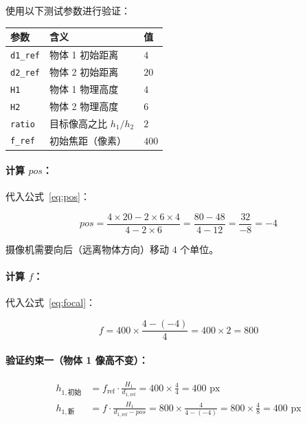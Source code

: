 \documentclass[12pt,a4paper]{ctexart}
\begin{document}
使用以下测试参数进行验证：

\begin{center}
\begin{tabular}{lll}
\toprule
参数 & 含义 & 值 \\
\midrule
\texttt{d1\_ref} & 物体 1 初始距离 & $4$ \\
\texttt{d2\_ref} & 物体 2 初始距离 & $20$ \\
\texttt{H1}      & 物体 1 物理高度 & $4$ \\
\texttt{H2}      & 物体 2 物理高度 & $6$ \\
\texttt{ratio}   & 目标像高之比 $h_1/h_2$ & $2$ \\
\texttt{f\_ref}  & 初始焦距（像素） & $400$ \\
\bottomrule
\end{tabular}
\end{center}

\paragraph{计算 $pos$：}代入公式~\eqref{eq:pos}：

\begin{equation}
  pos = \frac{4 \times 20 - 2 \times 6 \times 4}{4 - 2 \times 6} = \frac{80 - 48}{4 - 12} = \frac{32}{-8} = -4
\end{equation}

摄像机需要向后（远离物体方向）移动 $4$ 个单位。

\paragraph{计算 $f$：}代入公式~\eqref{eq:focal}：

\begin{equation}
  f = 400 \times \frac{4 - (-4)}{4} = 400 \times 2 = 800
\end{equation}

\paragraph{验证约束一（物体 1 像高不变）：}

\begin{align}
  h_{1,\text{初始}} &= f_\text{ref} \cdot \frac{H_1}{d_{1,\text{ref}}} = 400 \times \frac{4}{4} = 400 \text{ px} \\
  h_{1,\text{新}} &= f \cdot \frac{H_1}{d_{1,\text{ref}} - pos} = 800 \times \frac{4}{4-(-4)} = 800 \times \frac{4}{8} = 400 \text{ px}
\end{align}
\end{document}
